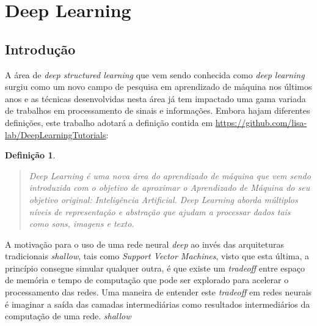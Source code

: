 
\section{Deep Learning}

\subsection{Introdução}

A área de \emph{deep structured learning} que vem sendo conhecida como
\emph{deep learning} surgiu como um novo campo de pesquisa em aprendizado de
máquina nos últimos anos e as técnicas desenvolvidas nesta área já tem
impactado uma gama variada de trabalhos em processamento de sinais e
informações. Embora hajam diferentes definições, este trabalho adotará a
definição contida em \url{https://github.com/lisa-lab/DeepLearningTutorials}:
\cite{deng2014deep}

\newtheorem{def-deep-learning}{Definição}

\begin{def-deep-learning}

  \begin{quote}

    \emph{Deep Learning} é uma nova área do aprendizado de máquina que vem
    sendo introduzida com o objetivo de aproximar o Aprendizado de Máquina do
    seu objetivo original: Inteligência Artificial. \emph{Deep Learning} aborda
    múltiplos níveis de representação e abstração que ajudam a processar dados
    tais como sons, imagens e texto.

  \end{quote}

\end{def-deep-learning}

A motivação para o uso de uma rede neural \emph{deep} ao invés das arquiteturas
tradicionais \emph{shallow}, tais como \emph{Support Vector Machines}, visto que
esta última, a princípio consegue simular qualquer outra, é que existe um
\emph{tradeoff} entre espaço de memória e tempo de computação que pode ser
explorado para acelerar o processamento das redes. Uma maneira de entender este
\emph{tradeoff} em redes neurais é imaginar a saída das camadas intermediárias
como resultados intermediários da computação de uma rede.
\emph{shallow}\cite{bengio2007scaling}

